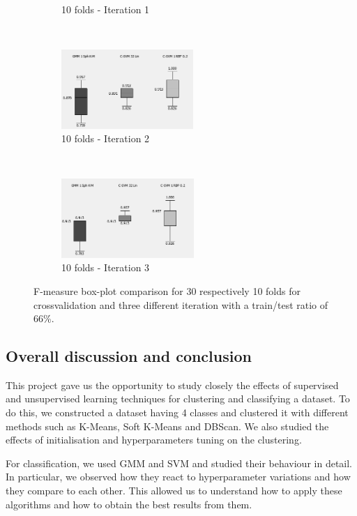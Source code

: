 \documentclass[a4paper,10pt]{article}
\begin{document}
\begin{figure}[H]
\begin{subfigure}[t]{0.3\textwidth}
      \caption{10 folds - Iteration 1}
      \label{fig:10-fold-train-test-ratio-66percent-test-data-A}
     \end{subfigure}
     ~
     \begin{subfigure}[t]{0.3\textwidth}
      \centering
      \includegraphics[height=3cm]{pictures/10-fold-train-test-ratio-66percent-test-data-B}
      \caption{10 folds - Iteration 2}
      \label{fig:10-fold-train-test-ratio-66percent-test-data-B}
     \end{subfigure}
      ~
    \begin{subfigure}[t]{0.3\textwidth}
      \centering
      \includegraphics[height=3cm]{pictures/10-fold-train-test-ratio-66percent-test-data-C}
      \caption{10 folds - Iteration 3}
      \label{fig:10-fold-train-test-ratio-66percent-test-data-C}
     \end{subfigure}
     \caption{F-measure box-plot comparison for 30 respectively 10 folds for crossvalidation and three different iteration with a train/test ratio of 66\%.}
     \label{fig:robustness-fold}
\end{figure}

\subsection{Overall discussion and conclusion}


This project gave us the opportunity to study closely the effects of supervised and unsupervised learning techniques for clustering and classifying a dataset. To do this, we constructed a dataset having 4 classes and clustered it with different methods such as K-Means, Soft K-Means and DBScan. We also studied the effects of initialisation and hyperparameters tuning on the clustering.

For classification, we used GMM and SVM and studied their behaviour in detail. In particular, we observed how they react to hyperparameter variations and how they compare to each other. This allowed us to understand how to apply these algorithms and how to obtain the best results from them.
\end{document}

